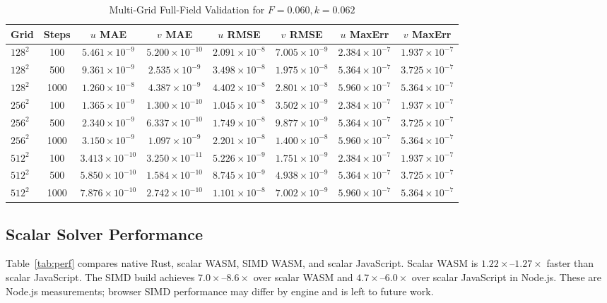 \documentclass[journal]{IEEEtran}
\begin{document}
\begin{table}[!t]
\renewcommand{\arraystretch}{1.15}
\caption{Multi-Grid Full-Field Validation for \(F=0.060, k=0.062\)}
\label{tab:multigrid}
\centering
\begin{tabular}{lccccccc}
\hline
Grid & Steps & \(u\) MAE & \(v\) MAE & \(u\) RMSE & \(v\) RMSE & \(u\) MaxErr & \(v\) MaxErr\\
\hline
\(128^2\) & 100 & \(5.461{\times}10^{-9}\) & \(5.200{\times}10^{-10}\) & \(2.091{\times}10^{-8}\) & \(7.005{\times}10^{-9}\) & \(2.384{\times}10^{-7}\) & \(1.937{\times}10^{-7}\)\\
\(128^2\) & 500 & \(9.361{\times}10^{-9}\) & \(2.535{\times}10^{-9}\) & \(3.498{\times}10^{-8}\) & \(1.975{\times}10^{-8}\) & \(5.364{\times}10^{-7}\) & \(3.725{\times}10^{-7}\)\\
\(128^2\) & 1000 & \(1.260{\times}10^{-8}\) & \(4.387{\times}10^{-9}\) & \(4.402{\times}10^{-8}\) & \(2.801{\times}10^{-8}\) & \(5.960{\times}10^{-7}\) & \(5.364{\times}10^{-7}\)\\
\(256^2\) & 100 & \(1.365{\times}10^{-9}\) & \(1.300{\times}10^{-10}\) & \(1.045{\times}10^{-8}\) & \(3.502{\times}10^{-9}\) & \(2.384{\times}10^{-7}\) & \(1.937{\times}10^{-7}\)\\
\(256^2\) & 500 & \(2.340{\times}10^{-9}\) & \(6.337{\times}10^{-10}\) & \(1.749{\times}10^{-8}\) & \(9.877{\times}10^{-9}\) & \(5.364{\times}10^{-7}\) & \(3.725{\times}10^{-7}\)\\
\(256^2\) & 1000 & \(3.150{\times}10^{-9}\) & \(1.097{\times}10^{-9}\) & \(2.201{\times}10^{-8}\) & \(1.400{\times}10^{-8}\) & \(5.960{\times}10^{-7}\) & \(5.364{\times}10^{-7}\)\\
\(512^2\) & 100 & \(3.413{\times}10^{-10}\) & \(3.250{\times}10^{-11}\) & \(5.226{\times}10^{-9}\) & \(1.751{\times}10^{-9}\) & \(2.384{\times}10^{-7}\) & \(1.937{\times}10^{-7}\)\\
\(512^2\) & 500 & \(5.850{\times}10^{-10}\) & \(1.584{\times}10^{-10}\) & \(8.745{\times}10^{-9}\) & \(4.938{\times}10^{-9}\) & \(5.364{\times}10^{-7}\) & \(3.725{\times}10^{-7}\)\\
\(512^2\) & 1000 & \(7.876{\times}10^{-10}\) & \(2.742{\times}10^{-10}\) & \(1.101{\times}10^{-8}\) & \(7.002{\times}10^{-9}\) & \(5.960{\times}10^{-7}\) & \(5.364{\times}10^{-7}\)\\
\hline
\end{tabular}
\end{table}

\subsection{Scalar Solver Performance}
Table~\ref{tab:perf} compares native Rust, scalar WASM, SIMD WASM, and scalar
JavaScript. Scalar WASM is \(1.22\times\)--\(1.27\times\) faster than scalar
JavaScript. The SIMD build achieves \(7.0\times\)--\(8.6\times\) over scalar
WASM and \(4.7\times\)--\(6.0\times\) over scalar JavaScript in Node.js. These
are Node.js measurements; browser SIMD performance may differ by engine and is
left to future work.
\end{document}
